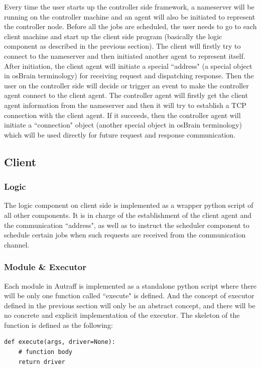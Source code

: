 \documentclass[12pt]{report}
\begin{document}
Every time the user starts up the controller side framework, a nameserver will be running on the controller machine and an agent will also be initiated to represent the controller node. Before all the jobs are scheduled, the user needs to go to each client machine and start up the client side program (basically the logic component as described in the previous section). The client will firstly try to connect to the nameserver and then initiated another agent to represent itself.\\

After initiation, the client agent will initiate a special ``address" (a special object in osBrain terminology) for receiving request and dispatching response. Then the user on the controller side will decide or trigger an event to make the controller agent connect to the client agent. The controller agent will firstly get the client agent information from the nameserver and then it will try to establish a TCP connection with the client agent. If it succeeds, then the controller agent will initiate a ``connection" object (another special object in osBrain terminology) which will be used directly for future request and response communication.


\subsection{Client}
\subsubsection{Logic}
The logic component on client side is implemented as a wrapper python script of all other components. It is in charge of the establishment of the client agent and the communication ``address", as well as to instruct the scheduler component to schedule certain jobs when such requests are received from the communication channel.

\subsubsection{Module \& Executor}
Each module in Autraff is implemented as a standalone python script where there will be only one function called ``execute" is defined. And the concept of executor defined in the previous section will only be an abstract concept, and there will be no concrete and explicit implementation of the executor. The skeleton of the function is defined as the following:

\begin{lstlisting}
def execute(args, driver=None):
    # function body
    return driver
\end{lstlisting}
\end{document}
